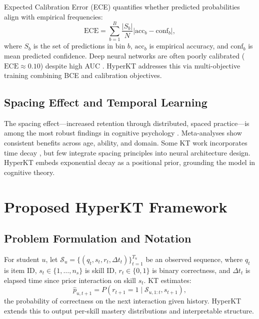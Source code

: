 \documentclass[preprint,12pt]{elsarticle}
\begin{document}
Expected Calibration Error (ECE) quantifies whether predicted probabilities align with empirical frequencies:
\begin{equation}
\text{ECE} = \sum_{b=1}^{B} \frac{|S_b|}{N} |\text{acc}_b - \text{conf}_b|,
\label{eq:ece}
\end{equation}
where $S_b$ is the set of predictions in bin $b$, $\text{acc}_b$ is empirical accuracy, and $\text{conf}_b$ is mean predicted confidence. Deep neural networks are often poorly calibrated ($\text{ECE} \approx 0.10$) despite high AUC \cite{guo2017calibration}. HyperKT addresses this via multi-objective training combining BCE and calibration objectives.

\subsection{Spacing Effect and Temporal Learning}

The spacing effect---increased retention through distributed, spaced practice---is among the most robust findings in cognitive psychology \cite{cepeda2006distributed}. Meta-analyses show consistent benefits across age, ability, and domain. Some KT work incorporates time decay \cite{nagatani2019augmenting}, but few integrate spacing principles into neural architecture design. HyperKT embeds exponential decay as a positional prior, grounding the model in cognitive theory.

\section{Proposed HyperKT Framework}\label{sec:method}

\subsection{Problem Formulation and Notation}

For student $u$, let $\mathcal{S}_u = \{(q_t, s_t, r_t, \Delta t_t)\}_{t=1}^{T_u}$ be an observed sequence, where $q_t$ is item ID, $s_t \in \{1, \ldots, n_s\}$ is skill ID, $r_t \in \{0, 1\}$ is binary correctness, and $\Delta t_t$ is elapsed time since prior interaction on skill $s_t$. KT estimates:
\begin{equation}
\hat{p}_{u,t+1} = P(r_{t+1} = 1 \mid \mathcal{S}_{u,1:t}, s_{t+1}),
\end{equation}
the probability of correctness on the next interaction given history. HyperKT extends this to output per-skill mastery distributions and interpretable structure.
\end{document}
